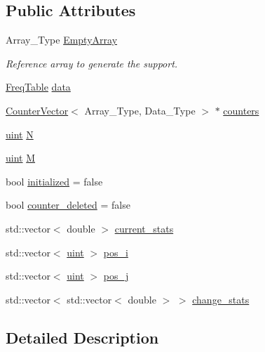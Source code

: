 \subsection*{Public Attributes}
\begin{DoxyCompactItemize}
\item 
Array\+\_\+\+Type \hyperlink{class_support_a9364028f9966697e3cdd3fc6a5cd90de}{Empty\+Array}
\begin{DoxyCompactList}\small\item\em Reference array to generate the support. \end{DoxyCompactList}\item 
\hyperlink{class_freq_table}{Freq\+Table} \hyperlink{class_support_ad399b4c1f9619c4e90dea0ffcf3c85c1}{data}
\item 
\hyperlink{class_counter_vector}{Counter\+Vector}$<$ Array\+\_\+\+Type, Data\+\_\+\+Type $>$ $\ast$ \hyperlink{class_support_a17bd2a9dca9bf7a167a47f4c8676183a}{counters}
\item 
\hyperlink{typedefs_8hpp_a91ad9478d81a7aaf2593e8d9c3d06a14}{uint} \hyperlink{class_support_ab15c7125d6b99ae15ec4dbb34c9ce9b6}{N}
\item 
\hyperlink{typedefs_8hpp_a91ad9478d81a7aaf2593e8d9c3d06a14}{uint} \hyperlink{class_support_ace1d46b871c67caa774ac2269930e97f}{M}
\item 
bool \hyperlink{class_support_ac352c6473720fcdcd9895c48bd872ef5}{initialized} = false
\item 
bool \hyperlink{class_support_acb3f9a11e2c64bdea950174f7c133536}{counter\+\_\+deleted} = false
\item 
std\+::vector$<$ double $>$ \hyperlink{class_support_ada67557033378742f8592a96f39d1127}{current\+\_\+stats}
\item 
std\+::vector$<$ \hyperlink{typedefs_8hpp_a91ad9478d81a7aaf2593e8d9c3d06a14}{uint} $>$ \hyperlink{class_support_a8e3b2d36d26bb771d1a49dfaad75b966}{pos\+\_\+i}
\item 
std\+::vector$<$ \hyperlink{typedefs_8hpp_a91ad9478d81a7aaf2593e8d9c3d06a14}{uint} $>$ \hyperlink{class_support_ac256816f09e47a843cf478a470223a5b}{pos\+\_\+j}
\item 
std\+::vector$<$ std\+::vector$<$ double $>$ $>$ \hyperlink{class_support_ae6e6f53f963c1be75bea0ee9896d1afe}{change\+\_\+stats}
\end{DoxyCompactItemize}


\subsection{Detailed Description}
